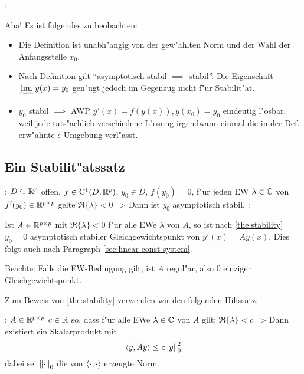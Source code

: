 \remark:{
  Aha! Es ist folgendes zu beobachten:
  \begin{itemize}
    \item Die Definition ist unabh"angig von der 
      gew"ahlten Norm und der Wahl der Anfangsstelle $x_0$.
    \item Nach Definition gilt ``asymptotisch stabil $\implies$ stabil''.
      Die Eigenschaft $\limes x->\infty y(x)=y_0$ gen"ugt jedoch
      im Gegenzug nicht f"ur Stabilit"at.
    \item $y_0$ stabil $\implies$ AWP $y'(x)=f(y(x)),y(x_0)=y_0$ eindeutig
      l"osbar, weil jede tats"achlich verschiedene L"osung irgendwann
      einmal die in der Def. erw"ahnte $\epsilon$-Umgebung verl"asst.
    \end{itemize}
  }
\subsection{Ein Stabilit"atssatz}
\theorem:
  $D\subseteq\mathbb R^p$ offen, $f\in{\rm C}^1(D,\mathbb R^p)$, $y_0\in D$,
  $f(y_0)=0$, f"ur jeden EW $\lambda\in\mathbb C$ von $f'(y_0)\in\mathbb R^{p\times p}$
  gelte $\Re\{\lambda\}<0$=>{
  \label{the:stability}
  Dann ist $y_0$ asymptotisch stabil.
  }
\remark:{
  Ist $A\in\mathbb R^{p\times p}$ mit $\Re\{\lambda\}<0$ f"ur alle EWe 
  $\lambda$ von $A$, so ist nach \ref{the:stability} $y_0=0$ 
  asymptotisch stabiler Gleichgewichtspunkt von $y'(x)=Ay(x)$. Dies
  folgt auch nach Paragraph \ref{sec:linear-const-system}.
  
  Beachte: Falls die EW-Bedingung gilt, ist $A$ regul"ar, also $0$ einziger
  Gleichgewichtspunkt.
  
  Zum Beweis von \ref{the:stability} verwenden wir den folgenden Hilfssatz:
  }
\theorem:
  $A\in\mathbb R^{p\times p}$ $c\in\mathbb R$ so, dass f"ur alle EWe $\lambda\in\mathbb C$ 
  von $A$ gilt: $\Re\{\lambda\}<c$=>{
  Dann existiert ein Skalarprodukt mit
  \[{\left\langle y,Ay \right\rangle} \leq c{\left\| y\right\|}_0^2
    \]
  dabei sei ${\left\| \cdot\right\|}_0$ die von ${\left\langle \cdot,\cdot \right\rangle} $ erzeugte Norm.
  }
